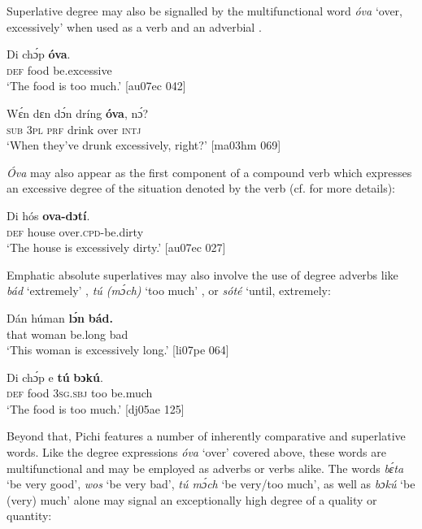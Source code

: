 Superlative degree may also be signalled by the multifunctional word \textit{óva} ‘over, excessively’ when used as a verb  and an adverbial . 


\ea%
    \label{ex:key:493}
    \gll Di  chɔ́p  \textbf{óva}.\\
\textsc{def}  food    be.excessive\\

\glt ‘The food is too much.’ [au07ec 042]
\z


\ea%
    \label{ex:key:494}
    \gll Wɛ́n    dɛn  dɔ́n  dríng  \textbf{óva},    nɔ́?\\
\textsc{sub}    \textsc{3pl}  \textsc{prf}  drink  over    \textsc{intj}\\

\glt ‘When they’ve drunk excessively, right?’ [ma03hm 069]
\z

\textit{\'{O}va} may also appear as the first component of a compound verb which expresses an excessive degree of the situation denoted by the verb (cf.  for more details):


\ea%
    \label{ex:key:495}
    \gll Di  hós    \textbf{ova-dɔtí}.\\
\textsc{def}  house  over.\textsc{cpd}{}-be.dirty\\

\glt ‘The house is excessively dirty.’ [au07ec 027]
\z

Emphatic absolute superlatives may also involve the use of degree adverbs like \textit{bád} ‘extremely’ , \textit{tú (mɔ́ch)} ‘too much’\textit{} , or \textit{sóté} ‘until, extremely:


\ea%
    \label{ex:key:496}
    \gll Dán    húman  \textbf{lɔ́n}    \textbf{bád.}\\
that    woman  be.long  bad\\

\glt ‘This woman is excessively long.’ [li07pe 064]
\z


\ea%
    \label{ex:key:497}
    \gll Di  chɔ́p  e    \textbf{tú}  \textbf{bɔkú}.\\
\textsc{def}  food    \textsc{3sg.sbj}  too  be.much\\

\glt ‘The food is too much.’ [dj05ae 125]
\z

Beyond that, Pichi features a number of inherently comparative and superlative words. Like the degree expressions \textit{óva} ‘over’ covered above, these words are multifunctional and may be employed as adverbs or verbs alike. The words \textit{bɛ́ta} ‘be very good’, \textit{wos} ‘be very bad’, \textit{tú mɔ́ch} ‘be very/too much’, as well as \textit{bɔkú} ‘be (very) much’ alone may signal an exceptionally high degree of a quality or quantity: 



